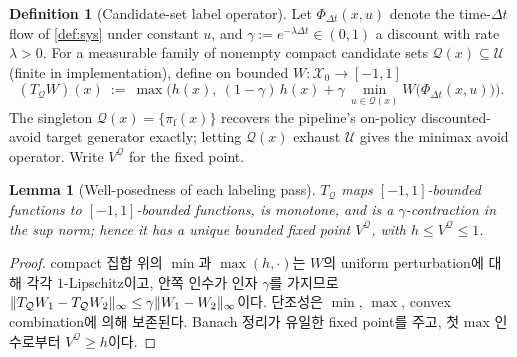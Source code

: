 \documentclass[11pt]{article}
\theoremstyle{plain}
\newtheorem{lemma}[theorem]{Lemma}
\theoremstyle{definition}
\newtheorem{definition}[theorem]{Definition}
\theoremstyle{remark}
\DeclarePairedDelimiter{\norm}{\lVert}{\rVert}
\newcommand{\calX}{\mathcal{X}}
\newcommand{\calU}{\mathcal{U}}
\newcommand{\calQ}{\mathcal{Q}}
\newcommand{\eqdef}{:=}
\begin{document}
\begin{definition}[Candidate-set label operator]\label{def:cand}
Let $\Phi_{\Delta t}(x,u)$ denote the time-$\Delta t$ flow of \cref{def:sys} under constant $u$,
and $\gamma\eqdef e^{-\lambda\Delta t}\in(0,1)$ a discount with rate $\lambda>0$. For a
measurable family of nonempty compact candidate sets $\calQ(x)\subseteq\calU$ (finite in
implementation), define on bounded $W:\calX_0\to[-1,1]$
\begin{equation}
(T_{\calQ}W)(x)\ \eqdef\ \max\Big(h(x),\ (1-\gamma)\,h(x)+\gamma\,\min_{u\in\calQ(x)}
W\big(\Phi_{\Delta t}(x,u)\big)\Big).
\end{equation}
The singleton $\calQ(x)=\{\pi_{\mathrm f}(x)\}$ recovers the pipeline's on-policy
discounted-avoid target generator exactly; letting $\calQ(x)$ exhaust $\calU$ gives the minimax
avoid operator. Write $V^{\calQ}$ for the fixed point.
\end{definition}

\begin{lemma}[Well-posedness of each labeling pass]\label{lem:label-wp}
$T_{\calQ}$ maps $[-1,1]$-bounded functions to $[-1,1]$-bounded functions, is monotone, and is a
$\gamma$-contraction in the sup norm; hence it has a unique bounded fixed point $V^{\calQ}$,
with $h\le V^{\calQ}\le1$.
\end{lemma}
\begin{proof}
compact 집합 위의 $\min$과 $\max(h,\cdot)$는 $W$의 uniform perturbation에 대해 각각
$1$-Lipschitz이고, 안쪽 인수가 인자 $\gamma$를 가지므로
$\norm{T_{\calQ}W_1-T_{\calQ}W_2}_\infty\le\gamma\norm{W_1-W_2}_\infty$이다. 단조성은 $\min$,
$\max$, convex combination에 의해 보존된다. Banach 정리가 유일한 fixed point를 주고, 첫 max
인수로부터 $V^{\calQ}\ge h$이다.
\end{proof}
\end{document}

